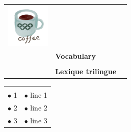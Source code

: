 

\thispagestyle{empty}


\begingroup
\setlength{\tabcolsep}{6pt} %
\renewcommand{\arraystretch}{0.5} %
\begin{tabular}{C{8.0cm}C{3.9cm}C{7.0cm}}
     \\
     & \textbf{\Large Vocabulary}  \\
     \\
     &\textbf{Lexique trilingue} &
    
\end{tabular}
\endgroup
\vspace*{1.2cm}



\vspace*{0.5cm}

\begingroup
\normalsize
\setlength{\tabcolsep}{6pt} %
\renewcommand{\arraystretch}{0.6} %
\begin{tabular}{|L{8.75cm}|R{8.75cm}|}
    \hline
         &  \\
        $\bullet$ 1 &  $\bullet$ line 1\\
        $\bullet$ 2 & $\bullet$ line 2 \\
        $\bullet$ 3 &  $\bullet$ line 3 \\
    \hline
\end{tabular}
\endgroup

